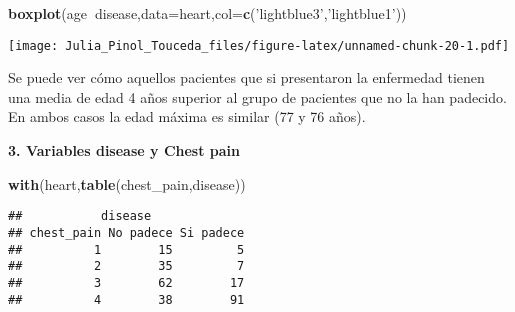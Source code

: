 \documentclass[]{article}
\newenvironment{Shaded}{\begin{snugshade}}{\end{snugshade}}
\newcommand{\KeywordTok}[1]{\textcolor[rgb]{0.13,0.29,0.53}{\textbf{#1}}}
\newcommand{\DataTypeTok}[1]{\textcolor[rgb]{0.13,0.29,0.53}{#1}}
\newcommand{\StringTok}[1]{\textcolor[rgb]{0.31,0.60,0.02}{#1}}
\newcommand{\OperatorTok}[1]{\textcolor[rgb]{0.81,0.36,0.00}{\textbf{#1}}}
\newcommand{\NormalTok}[1]{#1}
\begin{document}
\begin{Shaded}
\begin{Highlighting}[]
\KeywordTok{boxplot}\NormalTok{(age}\OperatorTok{~}\NormalTok{disease,}\DataTypeTok{data=}\NormalTok{heart,}\DataTypeTok{col=}\KeywordTok{c}\NormalTok{(}\StringTok{'lightblue3'}\NormalTok{,}\StringTok{'lightblue1'}\NormalTok{))}
\end{Highlighting}
\end{Shaded}

\texttt{[image: Julia\_Pinol\_Touceda\_files/figure-latex/unnamed-chunk-20-1.pdf]}

Se puede ver cómo aquellos pacientes que si presentaron la enfermedad
tienen una media de edad 4 años superior al grupo de pacientes que no la
han padecido. En ambos casos la edad máxima es similar (77 y 76 años).

\textbf{3. Variables disease y Chest pain}

\begin{Shaded}
\begin{Highlighting}[]
\KeywordTok{with}\NormalTok{(heart,}\KeywordTok{table}\NormalTok{(chest_pain,disease)) }
\end{Highlighting}
\end{Shaded}

\begin{verbatim}
##           disease
## chest_pain No padece Si padece
##          1        15         5
##          2        35         7
##          3        62        17
##          4        38        91
\end{verbatim}

\begin{Shaded}
\end{Shaded}
\end{document}
